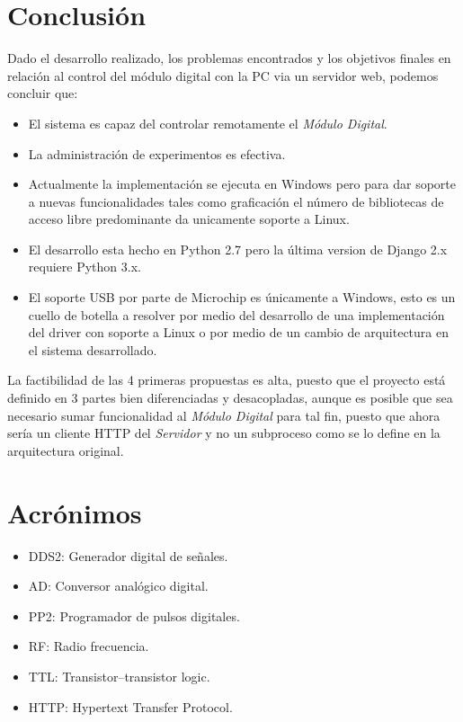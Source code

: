 \section{Conclusi\'on}

Dado el desarrollo realizado, los problemas encontrados y los objetivos finales en relaci\'on
al control del m\'odulo digital con la PC via un servidor web, podemos concluir que:

\begin{itemize}
    \item El sistema es capaz del controlar remotamente el \textit{M\'odulo Digital}.
    \item La administraci\'on de experimentos es efectiva.
    \item Actualmente la implementaci\'on se ejecuta en Windows pero para dar soporte a nuevas funcionalidades
    tales como graficaci\'on el n\'umero de bibliotecas de acceso libre predominante da unicamente soporte a Linux.
    \item El desarrollo esta hecho en Python 2.7 pero la \'ultima version de Django 2.x requiere Python 3.x.
    \item El soporte USB por parte de Microchip es \'unicamente a Windows, esto es un cuello de botella a resolver
    por medio del desarrollo de una implementaci\'on del driver con soporte a Linux o por medio de un cambio 
    de arquitectura en el sistema desarrollado.
\end{itemize}

La factibilidad de las 4 primeras propuestas es alta, puesto que el proyecto est\'a definido en 3 partes
bien diferenciadas y desacopladas, aunque es posible que sea necesario sumar funcionalidad 
al \textit{M\'odulo Digital} para tal fin, puesto que ahora ser\'ia un cliente HTTP del \textit{Servidor} y
no un subproceso como se lo define en la arquitectura original.

\newpage
\mbox{}
\newpage

\section{Acr\'onimos}

\begin{itemize}
    \item DDS2: Generador digital de se\~nales.
    \item AD: Conversor anal\'ogico digital.
    \item PP2: Programador de pulsos digitales.
    \item RF: Radio frecuencia.
    \item TTL: Transistor–transistor logic.
    \item HTTP: Hypertext Transfer Protocol.
\end{itemize}
\newpage
\mbox{}
\newpage